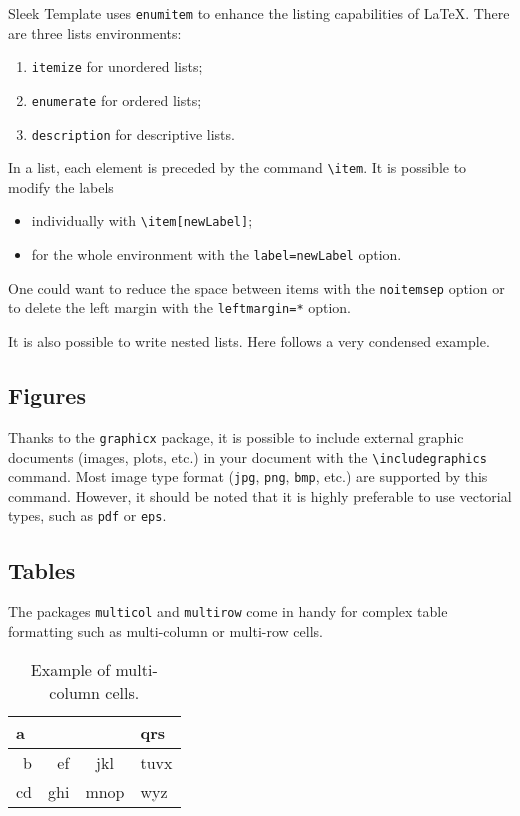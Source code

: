 \documentclass[a4paper, 12pt]{report}
\def\tbs{\textbackslash}
\begin{document}
Sleek Template uses \texttt{enumitem} to enhance the listing capabilities of \LaTeX{}. There are three lists environments:
\begin{enumerate}
	\item \texttt{itemize} for unordered lists;
	\item \texttt{enumerate} for ordered lists;
	\item \texttt{description} for descriptive lists.
\end{enumerate}

In a list, each element is preceded by the command \texttt{\tbs{}item}. It is possible to modify the labels
\begin{itemize}
	\item individually with \texttt{\tbs{}item[newLabel]};
	\item for the whole environment with the \texttt{label=newLabel} option.
\end{itemize}

One could want to reduce the space between items with the \texttt{noitemsep} option or to delete the left margin with the \texttt{leftmargin=*} option.

It is also possible to write nested lists. Here follows a very condensed example.

\subsection{Figures}

Thanks to the \texttt{graphicx} package, it is possible to include external graphic documents (images, plots, etc.) in your document with the \texttt{\tbs{}includegraphics} command. Most image type format (\texttt{jpg}, \texttt{png}, \texttt{bmp}, etc.) are supported by this command. However, it should be noted that it is highly preferable to use vectorial types, such as \texttt{pdf} or \texttt{eps}.


\subsection{Tables}

The packages \texttt{multicol} and \texttt{multirow} come in handy for complex table formatting such as multi-column or multi-row cells.

\begin{table}[H]
	\centering
	\begin{tabular}{|r|r|c|l|}
		\hline
		\multicolumn{3}{|l|}{a} & qrs  \\ \hline
		b &  ef &     jkl      & tuvx \\ \hline
		cd & ghi &     mnop     & wyz  \\ \hline
	\end{tabular}
	\caption{Example of multi-column cells.}
	\label{tab:multicol_example}
\end{table}
\end{document}
